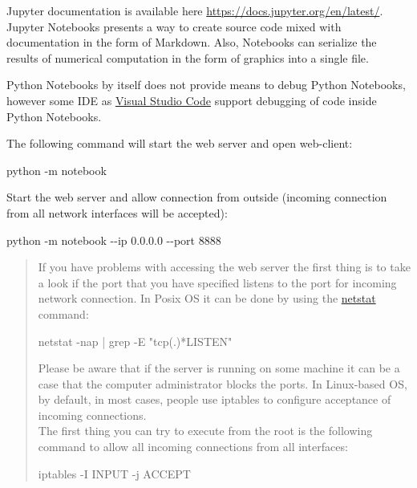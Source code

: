 \documentclass[
]{article}
\newenvironment{Shaded}{}{}
\newcommand{\AttributeTok}[1]{\textcolor[rgb]{0.49,0.56,0.16}{#1}}
\newcommand{\ExtensionTok}[1]{#1}
\newcommand{\NormalTok}[1]{#1}
\newcommand{\OperatorTok}[1]{\textcolor[rgb]{0.40,0.40,0.40}{#1}}
\newcommand{\StringTok}[1]{\textcolor[rgb]{0.25,0.44,0.63}{#1}}
\begin{document}
Jupyter documentation is available here
\url{https://docs.jupyter.org/en/latest/}. Jupyter Notebooks presents a
way to create source code mixed with documentation in the form of
Markdown. Also, Notebooks can serialize the results of numerical
computation in the form of graphics into a single file.

Python Notebooks by itself does not provide means to debug Python
Notebooks, however some IDE as
\href{https://code.visualstudio.com/}{Visual Studio Code} support
debugging of code inside Python Notebooks.

The following command will start the web server and open web-client:

\begin{Shaded}
\begin{Highlighting}[]
\ExtensionTok{python} \AttributeTok{{-}m}\NormalTok{ notebook}
\end{Highlighting}
\end{Shaded}

Start the web server and allow connection from outside (incoming
connection from all network interfaces will be accepted):

\begin{Shaded}
\begin{Highlighting}[]
\ExtensionTok{python} \AttributeTok{{-}m}\NormalTok{ notebook }\AttributeTok{{-}{-}ip}\NormalTok{ 0.0.0.0 }\AttributeTok{{-}{-}port}\NormalTok{ 8888}
\end{Highlighting}
\end{Shaded}

\begin{quote}
If you have problems with accessing the web server the first thing is to
take a look if the port that you have specified listens to the port for
incoming network connection. In Posix OS it can be done by using the
\href{https://linux.die.net/man/8/netstat}{netstat} command:

\begin{Shaded}
\begin{Highlighting}[]
\NormalTok{netstat }\OperatorTok{{-}}\NormalTok{nap }\OperatorTok{|}\NormalTok{ grep }\OperatorTok{{-}}\NormalTok{E }\StringTok{"tcp(.)*LISTEN"}
\end{Highlighting}
\end{Shaded}

Please be aware that if the server is running on some machine it can be
a case that the computer administrator blocks the ports. In Linux-based
OS, by default, in most cases, people use iptables to configure
acceptance of incoming connections. \\
The first thing you can try to execute from the root is the following
command to allow all incoming connections from all interfaces:

\begin{Shaded}
\begin{Highlighting}[]
\NormalTok{iptables }\OperatorTok{{-}}\NormalTok{I INPUT }\OperatorTok{{-}}\NormalTok{j ACCEPT}
\end{Highlighting}
\end{Shaded}
\end{quote}
\end{document}

